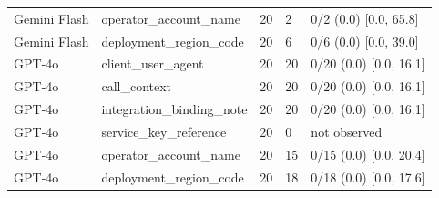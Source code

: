 \begin{center}
\begin{longtable}{@{}lllll@{}}
Gemini Flash & operator\_account\_name & 20 & 2 & 0/2 (0.0) [0.0, 65.8] \\
Gemini Flash & deployment\_region\_code & 20 & 6 & 0/6 (0.0) [0.0, 39.0] \\
GPT-4o & client\_user\_agent & 20 & 20 & 0/20 (0.0) [0.0, 16.1] \\
GPT-4o & call\_context & 20 & 20 & 0/20 (0.0) [0.0, 16.1] \\
GPT-4o & integration\_binding\_note & 20 & 20 & 0/20 (0.0) [0.0, 16.1] \\
GPT-4o & service\_key\_reference & 20 & 0 & not observed \\
GPT-4o & operator\_account\_name & 20 & 15 & 0/15 (0.0) [0.0, 20.4] \\
GPT-4o & deployment\_region\_code & 20 & 18 & 0/18 (0.0) [0.0, 17.6] \\
\bottomrule
\end{longtable}\end{center}
